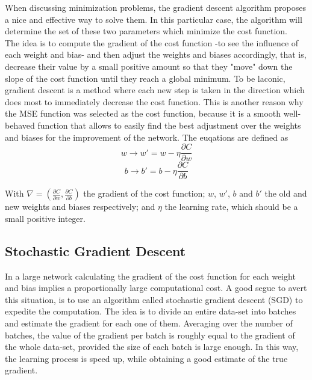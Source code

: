 When discussing minimization problems, the gradient descent algorithm proposes a nice and effective way to solve them. In this particular case, the algorithm will determine the set of these two parameters which minimize the cost function.\\
The idea is to compute the gradient of the cost function -to see the influence of each weight and bias- and then adjust the weights and biases accordingly, that is, decrease their value by a small positive amount so that they "move" down the slope of the cost function until they reach a global minimum. To be laconic, gradient descent is a method where each new step is taken in the direction which does most to immediately decrease the cost function. This is another reason why the MSE function was selected as the cost function, because it is a smooth well-behaved function that allows to easily find the best adjustment over the weights and biases for the improvement of the network. The euqations are defined as
\begin{equation}
    w \rightarrow w' = w -\eta \frac{\partial C }{\partial w} 
\end{equation}
\begin{equation}
    b \rightarrow b' = b -\eta \frac{\partial C }{\partial b} 
\end{equation}

With $\nabla = (\frac{\partial C }{\partial w}  , \frac{\partial C }{\partial b} )$ the gradient of the cost function; $w$, $w'$, $b$ and $b'$ the old and new weights and biases respectively; and $\eta$ the learning rate, which should be a small positive integer. 

\subsection{Stochastic Gradient Descent}\label{SGDtheo}

In a large network calculating the gradient of the cost function for each weight and bias implies a proportionally large computational cost. A good segue to avert this situation, is to use an algorithm called stochastic gradient descent (SGD) to expedite the computation. The idea is to divide an entire data-set into batches and estimate the gradient for each one of them. Averaging over the number of batches, the value of the gradient per batch is roughly equal to the gradient of the whole data-set, provided the size of each batch is large enough. In this way, the learning process is speed up, while obtaining a good estimate of the true gradient.  
